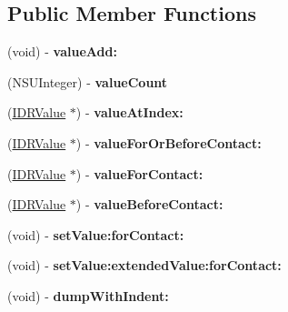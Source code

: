 \subsection*{Public Member Functions}
\begin{DoxyCompactItemize}
\item 
\hypertarget{interface_i_d_r_obs_definition_a66144a589cca68cdfd1e69be386583ba}{
(void) -\/ {\bfseries valueAdd:}}
\label{interface_i_d_r_obs_definition_a66144a589cca68cdfd1e69be386583ba}

\item 
\hypertarget{interface_i_d_r_obs_definition_af05300e98054fa5f1774e78367e58569}{
(NSUInteger) -\/ {\bfseries valueCount}}
\label{interface_i_d_r_obs_definition_af05300e98054fa5f1774e78367e58569}

\item 
\hypertarget{interface_i_d_r_obs_definition_a2ec6ffb94035983d5f16ceb18accca56}{
(\hyperlink{interface_i_d_r_value}{IDRValue} $\ast$) -\/ {\bfseries valueAtIndex:}}
\label{interface_i_d_r_obs_definition_a2ec6ffb94035983d5f16ceb18accca56}

\item 
\hypertarget{interface_i_d_r_obs_definition_a154c4ffea9c6c8590083271e68ca35f8}{
(\hyperlink{interface_i_d_r_value}{IDRValue} $\ast$) -\/ {\bfseries valueForOrBeforeContact:}}
\label{interface_i_d_r_obs_definition_a154c4ffea9c6c8590083271e68ca35f8}

\item 
\hypertarget{interface_i_d_r_obs_definition_ac033bdf964e938b3e92b62da3bc886b2}{
(\hyperlink{interface_i_d_r_value}{IDRValue} $\ast$) -\/ {\bfseries valueForContact:}}
\label{interface_i_d_r_obs_definition_ac033bdf964e938b3e92b62da3bc886b2}

\item 
\hypertarget{interface_i_d_r_obs_definition_a6c4371fe0ad89842b1c706ca5b39338e}{
(\hyperlink{interface_i_d_r_value}{IDRValue} $\ast$) -\/ {\bfseries valueBeforeContact:}}
\label{interface_i_d_r_obs_definition_a6c4371fe0ad89842b1c706ca5b39338e}

\item 
\hypertarget{interface_i_d_r_obs_definition_a16bd4113959e784ab792f7f8d133a909}{
(void) -\/ {\bfseries setValue:forContact:}}
\label{interface_i_d_r_obs_definition_a16bd4113959e784ab792f7f8d133a909}

\item 
\hypertarget{interface_i_d_r_obs_definition_a76345b0e8965b009adb34e4be2cb6cce}{
(void) -\/ {\bfseries setValue:extendedValue:forContact:}}
\label{interface_i_d_r_obs_definition_a76345b0e8965b009adb34e4be2cb6cce}

\item 
\hypertarget{interface_i_d_r_obs_definition_ab4cb45eef9fee48a0dabd6e782569f4f}{
(void) -\/ {\bfseries dumpWithIndent:}}
\label{interface_i_d_r_obs_definition_ab4cb45eef9fee48a0dabd6e782569f4f}

\end{DoxyCompactItemize}
